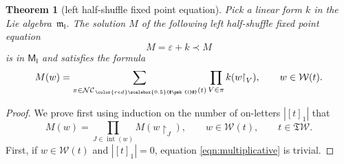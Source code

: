 \documentclass[pdftex]{sigma}
\newcommand\INT[1]{\operatorname{int}(#1)}
\renewcommand{\restriction}[2]{{#1\mathbin{\upharpoonright}_{#2}}}
\newcommand{\SWc}{{\mathfrak{T}\mathcal{W}}}
\newcommand\IWc{\mathcal{W}}
\newcommand{\BNCc}{\mathcal{N}\mathcal{C}}
\def\shBNCc{\BNCc_{\,{\color{red}\scalebox{0.5}{$\pmb{|}$}}}}
\newcommand\shgrI{{\mathsf M}_{\mathsf I}}
\newcommand\shalI{{\mathfrak m}_{\mathsf I}}
\numberwithin{equation}{section}
\newtheorem{Theorem}{Theorem}[section]
\begin{document}
\begin{Theorem}[left half-shuffle fixed point equation]
	\label{thm:lefthalfshuffle}
	Pick a linear form $k$ in the Lie algebra~$\shalI$. The solution $M$ of the following left half-shuffle fixed point equation
	\begin{equation*}
		M = \varepsilon + k \prec M
	\end{equation*}
	is in $\shgrI$ and satisfies the formula
	\begin{equation}\label{eqn:toprove}
		M(w) = \sum_{\pi \in \shBNCc(t)} \prod_{V\in\pi}k(\restriction{w}{V}),\qquad w\in \IWc(t).
	\end{equation}
\end{Theorem}
\begin{proof}
	We prove first using induction on the number of on-letters $|[t]_1|$ that
	\begin{equation}\label{eqn:multiplicative}
 M(w) = \prod_{J\in \INT{w}} M(\restriction{w}{J}),\qquad w \in \IWc(t),\qquad t \in \SWc.
	\end{equation}
	First, if $w \in \IWc(t)$ and $|[t]_1|=0$, equation \eqref{eqn:multiplicative} is trivial.


\end{proof}
\end{document}
